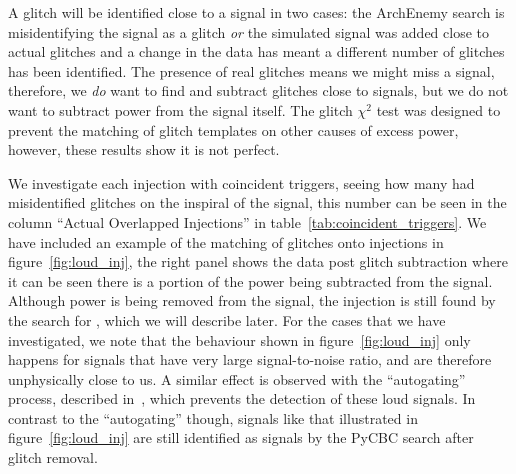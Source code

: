 A \scl{} glitch will be identified close to a \gw{} signal in two cases: the ArchEnemy search is misidentifying the \gw{} signal as a glitch \emph{or} the simulated signal was added close to actual glitches and a change in the data has meant a different number of glitches has been identified. The presence of real \scl{} glitches means we might miss a \gw{} signal, therefore, we \emph{do} want to find and subtract glitches close to \gw{} signals, but we do not want to subtract power from the \gw{} signal itself. The \scl{} glitch $\chi^{2}$ test was designed to prevent the matching of \scl{} glitch templates on other causes of excess power, however, these results show it is not perfect.

We investigate each injection with coincident \scl{} triggers, seeing how many had misidentified \scl{} glitches on the inspiral of the \gw{} signal, this number can be seen in the column ``Actual Overlapped Injections'' in table~\ref{tab:coincident_triggers}. We have included an example of the matching of \scl{} glitches onto \gw{} injections in figure~\ref{fig:loud_inj}, the right panel shows the \gw{} data post glitch subtraction where it can be seen there is a portion of the power being subtracted from the signal. Although power is being removed from the signal, the \gw{} injection is still found by the search for \gws{}, which we will describe later. For the cases that we have investigated, we note that the behaviour shown in figure~\ref{fig:loud_inj} only happens for signals that have very large signal-to-noise ratio, and are therefore unphysically close to us. A similar effect is observed with the ``autogating'' process, described in~\cite{pycbc}, which prevents the detection of these loud signals. In contrast to the ``autogating'' though, signals like that illustrated in figure~\ref{fig:loud_inj} are still identified as \gw{} signals by the PyCBC search after \scl{} glitch removal.

